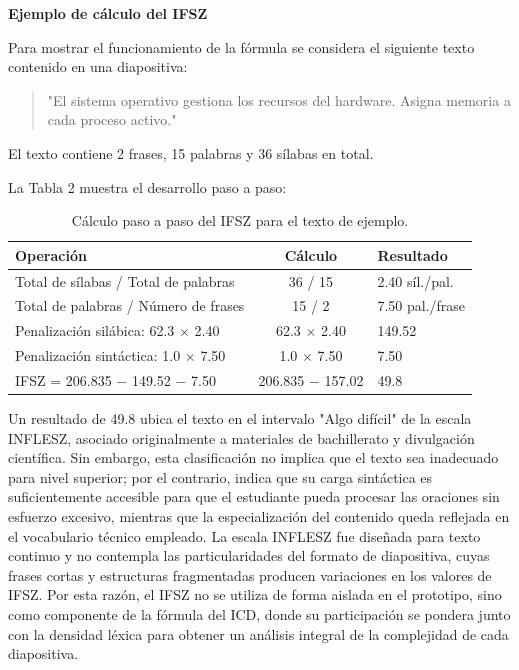 \documentclass[11pt]{article}
\begin{document}
\textbf{Ejemplo de cálculo del IFSZ}

Para mostrar el funcionamiento de la fórmula se considera el siguiente texto contenido en una diapositiva:
\begin{quote}
"El sistema operativo gestiona los recursos del hardware. Asigna memoria a cada proceso activo."
\end{quote}
El texto contiene 2 frases, 15 palabras y 36 sílabas en total.

La Tabla 2 muestra el desarrollo paso a paso:

\begin{table}[H]
    \centering
    \begin{tabular}{|p{5.4cm}|c|p{3.6cm}|}
        \hline
        \textbf{Operación} & \textbf{Cálculo} & \textbf{Resultado} \\
        \hline
        Total de sílabas / Total de palabras & 36 / 15 & 2.40 síl./pal. \\
        \hline
        Total de palabras / Número de frases & 15 / 2 & 7.50 pal./frase \\
        \hline
        Penalización silábica: 62.3 $\times$ 2.40 & 62.3 $\times$ 2.40 & 149.52 \\
        \hline
        Penalización sintáctica: 1.0 $\times$ 7.50 & 1.0 $\times$ 7.50 & 7.50 \\
        \hline
        IFSZ = 206.835 $-$ 149.52 $-$ 7.50 & 206.835 $-$ 157.02 & 49.8 \\
        \hline
    \end{tabular}
    \caption{Cálculo paso a paso del IFSZ para el texto de ejemplo.}
\end{table}
Un resultado de 49.8 ubica el texto en el intervalo "Algo difícil" de la escala INFLESZ, asociado originalmente a materiales de bachillerato y divulgación científica. Sin embargo, esta clasificación no implica que el texto sea inadecuado para nivel superior; por el contrario, indica que su carga sintáctica es suficientemente accesible para que el estudiante pueda procesar las oraciones sin esfuerzo excesivo, mientras que la especialización del contenido queda reflejada en el vocabulario técnico empleado. La escala INFLESZ fue diseñada para texto continuo y no contempla las particularidades del formato de diapositiva, cuyas frases cortas y estructuras fragmentadas producen variaciones en los valores de IFSZ. Por esta razón, el IFSZ no se utiliza de forma aislada en el prototipo, sino como componente de la fórmula del ICD, donde su participación se pondera junto con la densidad léxica para obtener un análisis integral de la complejidad de cada diapositiva.
\end{document}
